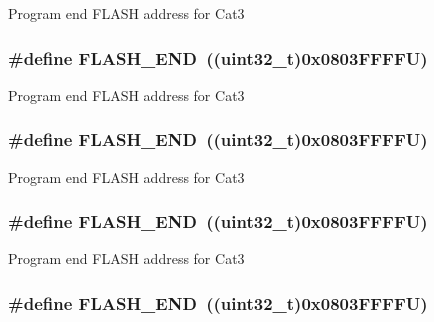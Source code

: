 Program end F\-L\-A\-S\-H address for Cat3 \hypertarget{group___peripheral__memory__map_ga8be554f354e5aa65370f6db63d4f3ee4}{
\subsubsection[{F\-L\-A\-S\-H\-\_\-\-E\-N\-D}]{\setlength{\rightskip}{0pt plus 5cm}\#define F\-L\-A\-S\-H\-\_\-\-E\-N\-D~((uint32\-\_\-t)0x0803\-F\-F\-F\-F\-U)}}\label{group___peripheral__memory__map_ga8be554f354e5aa65370f6db63d4f3ee4}
Program end F\-L\-A\-S\-H address for Cat3 \hypertarget{group___peripheral__memory__map_ga8be554f354e5aa65370f6db63d4f3ee4}{
\subsubsection[{F\-L\-A\-S\-H\-\_\-\-E\-N\-D}]{\setlength{\rightskip}{0pt plus 5cm}\#define F\-L\-A\-S\-H\-\_\-\-E\-N\-D~((uint32\-\_\-t)0x0803\-F\-F\-F\-F\-U)}}\label{group___peripheral__memory__map_ga8be554f354e5aa65370f6db63d4f3ee4}
Program end F\-L\-A\-S\-H address for Cat3 \hypertarget{group___peripheral__memory__map_ga8be554f354e5aa65370f6db63d4f3ee4}{
\subsubsection[{F\-L\-A\-S\-H\-\_\-\-E\-N\-D}]{\setlength{\rightskip}{0pt plus 5cm}\#define F\-L\-A\-S\-H\-\_\-\-E\-N\-D~((uint32\-\_\-t)0x0803\-F\-F\-F\-F\-U)}}\label{group___peripheral__memory__map_ga8be554f354e5aa65370f6db63d4f3ee4}
Program end F\-L\-A\-S\-H address for Cat3 \hypertarget{group___peripheral__memory__map_ga8be554f354e5aa65370f6db63d4f3ee4}{
\subsubsection[{F\-L\-A\-S\-H\-\_\-\-E\-N\-D}]{\setlength{\rightskip}{0pt plus 5cm}\#define F\-L\-A\-S\-H\-\_\-\-E\-N\-D~((uint32\-\_\-t)0x0803\-F\-F\-F\-F\-U)}}\label{group___peripheral__memory__map_ga8be554f354e5aa65370f6db63d4f3ee4}
